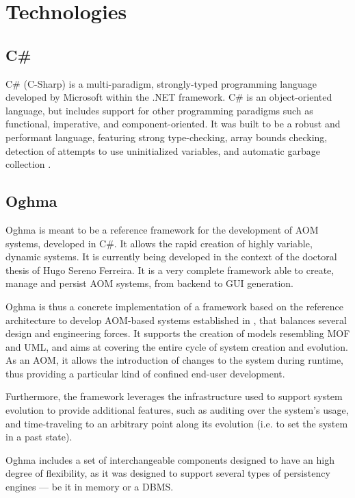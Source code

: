 \chapter{Technologies}\label{chap:technologies}

\section{C\#}\label{sec:csharp}

C\# (C-Sharp) is a multi-paradigm, strongly-typed programming language developed by Microsoft within the .NET framework. C\# is an object-oriented language, but includes support for other programming paradigms such as functional, imperative, and component-oriented. It was built to be a robust and performant language, featuring strong type-checking, array bounds checking, detection of attempts to use uninitialized variables, and automatic garbage collection \cite{csharp}.

\section{Oghma}\label{sec:oghma}

Oghma is meant to be a reference framework for the development of AOM systems, developed in C\#. It allows the rapid creation of highly variable, dynamic systems. It is currently being developed in the context of the doctoral thesis of Hugo Sereno Ferreira. It is a very complete framework able to create, manage and persist AOM systems, from backend to GUI generation.

Oghma is thus a concrete implementation of a framework based on the reference architecture to develop AOM-based systems established in \cite{ferreira_phd_2010}, that balances several design and engineering forces. It supports the creation of models resembling MOF \cite{mof} and UML, and aims at covering the entire cycle of system creation and evolution. As an AOM, it allows the introduction of changes to the system during runtime, thus providing a particular kind of confined end-user development.

Furthermore, the framework leverages the infrastructure used to support system evolution to provide additional features, such as auditing over the system’s usage, and time-traveling to an arbitrary point along its evolution (i.e. to set the system in a past state).

Oghma includes a set of interchangeable components designed to have an high degree of flexibility, as it was designed to support several types of persistency engines --- be it in memory or a DBMS.

